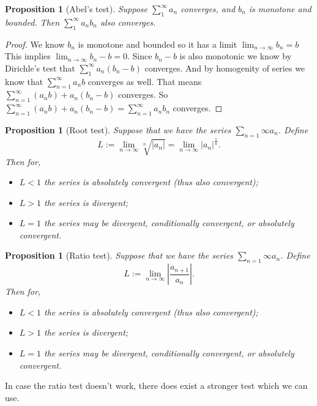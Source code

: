 \documentclass[11pt,a4paper]{article}
\theoremstyle{definition}
\theoremstyle{plain}
\newtheorem{proposition}[theorem]{Proposition}
\newcommand{\abs}[1]{\left\lvert #1\right\rvert}
\begin{document}
  \begin{proposition}[Abel's test]
	Suppose $\sum_{1}^{\infty}{a_n}$ converges, and $b_n$ is monotone and bounded.
    Then $\sum_{1}^{\infty}{a_nb_n}$ also converges.
  \end{proposition}
	\begin{proof}
		We know $b_n$ is monotone and bounded so it has a limit $\lim_{n\to\infty}{b_n}=b$
		This implies $\lim_{n\to\infty}{b_n-b}=0$. 
		Since $b_n-b$ is also monotonic we know by Dirichle's test that 
		$\sum_{1}^{\infty}{a_n(b_n-b)}$ converges. And by homogenity of series we know that
		 $\sum_{n=1}^{\infty}{a_n b}$ converges as well.
		That means $\sum_{n=1}^{\infty}{(a_n b)+a_n(b_n-b)}$ converges.
		So $\sum_{n=1}^{\infty}{(a_n b)+a_n(b_n-b)} = \sum_{n=1}^{\infty}{a_nb_n}$
    converges.
	\end{proof}

  \begin{proposition}[Root test]
    Suppose that we have the series $\sum_{n=1}{\infty} a_n$.
    Define
    \[
      L :=
      \lim_{n \to \infty} \sqrt[n]{\abs{a_n}} =
      \lim_{n \to \infty} \abs{a_n}^{\frac{1}{n}}.
    \]
    Then for,
    \begin{itemize}
      \item $L < 1$ the series is absolutely convergent (thus also convergent);
      \item $L > 1$ the series is divergent;
      \item $L = 1$ the series may be divergent, conditionally convergent,
        or absolutely convergent.
    \end{itemize}
  \end{proposition}
  
  \begin{proposition}[Ratio test]
    Suppose that we have the series $\sum_{n=1}{\infty} a_n$.
    Define
    \[
      L :=
      \lim_{n \to \infty} \abs{\frac{a_{n+1}}{a_{n}}}.
    \]
    Then for,
    \begin{itemize}
      \item $L < 1$ the series is absolutely convergent (thus also convergent);
      \item $L > 1$ the series is divergent;
      \item $L = 1$ the series may be divergent, conditionally convergent,
        or absolutely convergent.
    \end{itemize}
  \end{proposition}

  In case the ratio test doesn't work, there does exist a stronger
  test which we can use.
  
\end{document}
